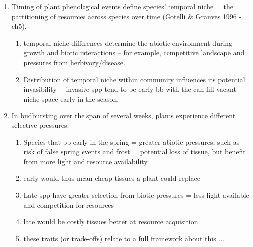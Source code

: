\documentclass{article}
\begin{document}
\begin{enumerate}
\item Timing of plant phenological events define species' temporal niche = the partitioning of resources across species over time (Gotelli \& Granves 1996 - ch5). %
\begin{enumerate} 
\item temporal niche differences determine the abiotic environment during growth and biotic interactions -- for example, competitive landscape and pressures from herbivory/disease. %
\item Distribution of temporal niche within community influences its potential invasibility--- invasive spp tend to be early bb with the can fill vacant niche space early in the season. 

\end{enumerate}

\item In budbursting over the span of several weeks, plants experience different selective pressures.  %
\begin{enumerate}
\item Species that bb early in the spring = greater abiotic pressures, such as risk of false spring events and frost = potential loss of tissue, but benefit from more light and resource availability
\item early would thus mean cheap tissues a plant could replace
\item Late spp have greater selection from biotic pressures = less light available and competition for resources 
\item late would be costly tissues better at resource acquisition
\item these traits (or trade-offs) relate to a full framework about this ... 
\end{enumerate}


\end{enumerate}
\end{document}
